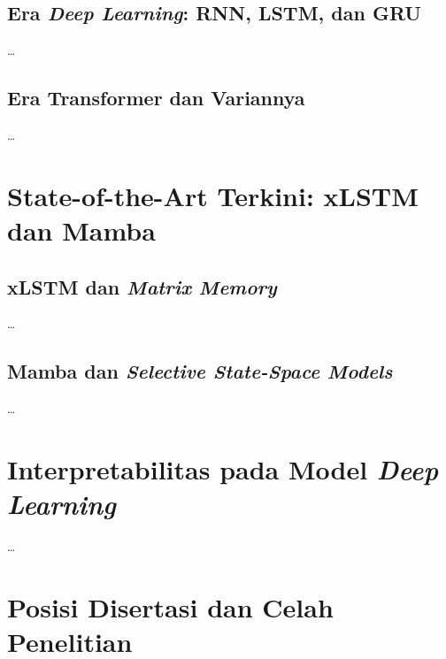 \subsection{Era \emph{Deep Learning}: RNN, LSTM, dan GRU}
\label{subsec:bab2_dl_lstm}

\dots

\subsection{Era Transformer dan Variannya}
\label{subsec:bab2_transformer}

\dots

\section{State-of-the-Art Terkini: xLSTM dan Mamba}
\label{subsec:bab2_sota}

\subsection{xLSTM dan \emph{Matrix Memory}}
\label{subsec:bab2_xlstm}

\dots

\subsection{Mamba dan \emph{Selective State-Space Models}}
\label{subsec:bab2_mamba}

\dots

\section{Interpretabilitas pada Model \emph{Deep Learning}}
\label{subsec:bab2_interpret}

\dots

\section{Posisi Disertasi dan Celah Penelitian}
\label{subsec:bab2_posisi}

